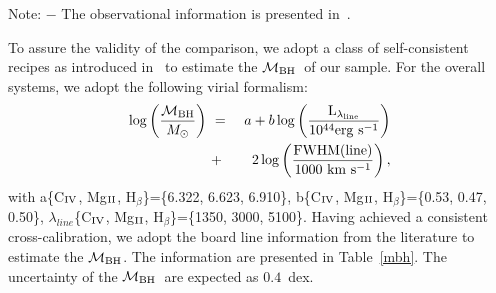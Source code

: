 \documentclass[fleqn,usenatbib]{mnras}
\newcommand{\mbh}{$\mathcal M_{\rm BH}$}
\newcommand{\Hb}{H$_{\beta}$}
\newcommand{\Mgii}{Mg$_{\rm II}$}
\newcommand{\Civ}{C$_{\rm IV}$}
\begin{document}
\begin{table}
\centering
\caption{Summary of lensed AGN information.}\label{data_set}
\begin{tablenotes}
      \small
      \item Note: $-$ The observational information is presented in~\citet{Ding2017a}.
\end{tablenotes}  
\end{table}

To assure the validity of the comparison, we adopt a class of self-consistent recipes as introduced in~\citet{Ding2020} to estimate the \mbh\ of our sample. For the overall systems, we adopt the following virial formalism:
\begin{eqnarray}
\label{recipe}
\log \left(\frac{\mathcal M_{\rm BH}}{M_{\odot}}\right)&~=~& a+b \log \left(\frac{ \rm L _{\lambda_{line}}}{10^{44}{\rm erg~s^{-1}}}\right) \nonumber\\
&~+~& 2 \log \left(\frac{\rm FWHM(line)}{1000 ~{\rm km~s^{-1}}}\right) , 
\end {eqnarray}
%
with a\{\Civ, \Mgii, \Hb\}=\{6.322, 6.623, 6.910\},
b\{\Civ, \Mgii, \Hb\}=\{0.53, 0.47, 0.50\},
$\lambda_{line}$\{\Civ, \Mgii, \Hb\}=\{1350, 3000, 5100\}.
%
Having achieved a consistent cross-calibration, we adopt the board line information from the literature to estimate the \mbh. The information are presented in Table~\ref{mbh}. The uncertainty of the \mbh\ are expected as $0.4$~dex.
\end{document}
